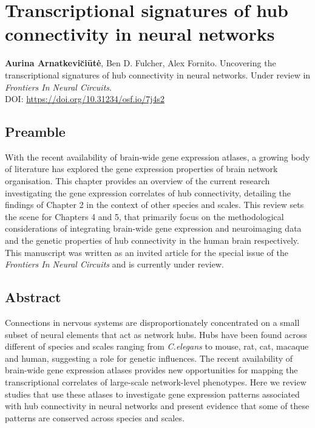 \chapter{Transcriptional signatures of hub \\connectivity in neural networks}
\label{ch:Chapter3}



\textbf{Aurina Arnatkevi\u{c}i\={u}t\.{e}},
Ben D. Fulcher,
Alex Fornito.
Uncovering the transcriptional signatures of hub connectivity in neural networks. Under review in \textit{
Frontiers In Neural Circuits}.\\
DOI: \url{https://doi.org/10.31234/osf.io/7j4s2} %

\section*{Preamble}
With the recent availability of brain-wide gene expression atlases, a growing body of literature has explored the gene expression properties of brain network organisation. This chapter provides an overview of the current research investigating the gene expression correlates of hub connectivity, detailing the findings of Chapter 2 in the context of other species and scales. This review sets the scene for Chapters 4 and 5, that primarily focus on the methodological considerations of integrating brain-wide gene expression and neuroimaging data and the genetic properties of hub connectivity in the human brain respectively. This manuscript was written as an invited article for the special issue of the \textit{Frontiers In Neural Circuits} and is currently under review.

\newpage

\section*{Abstract}
Connections in nervous systems are disproportionately concentrated on a small subset of neural elements that act as network hubs. Hubs have been found across different of species and scales ranging from \textit{C.elegans} to mouse, rat, cat, macaque and human, suggesting a role for genetic influences. The recent availability of brain-wide gene expression atlases provides new opportunities for mapping the transcriptional correlates of large-scale network-level phenotypes. Here we review studies that use these atlases to investigate gene expression patterns associated with hub connectivity in neural networks and present evidence that some of these patterns are conserved across species and scales.

